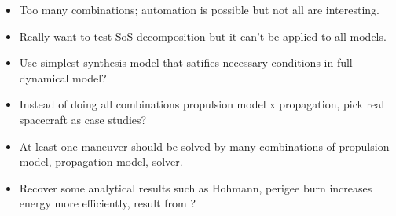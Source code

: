 \begin{itemize}
    \item Too many combinations; automation is possible but not all are interesting.
    \item Really want to test SoS decomposition but it can't be applied to all models.
    \item Use simplest synthesis model that satifies necessary conditions in full dynamical model?
    \item Instead of doing all combinations propulsion model x propagation, pick real spacecraft as case studies?
    \item At least one maneuver should be solved by many combinations of propulsion model, propagation model, solver.
    \item Recover some analytical results such as Hohmann, perigee burn increases energy more efficiently, result from \cite{sandro_quasi_circ}?
\end{itemize}